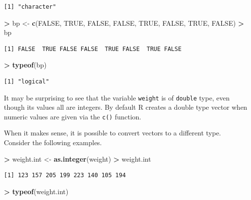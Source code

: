 \documentclass[]{krantz}
\makeatletter
\newenvironment{Shaded}{\begin{snugshade}}{\end{snugshade}}
\newcommand{\KeywordTok}[1]{\textcolor[rgb]{0.27,0.27,0.27}{\textbf{#1}}}
\newcommand{\StringTok}[1]{\textcolor[rgb]{0.5,0.5,0.5}{#1}}
\newcommand{\OtherTok}[1]{\textcolor[rgb]{0.37,0.37,0.37}{#1}}
\newcommand{\OperatorTok}[1]{\textcolor[rgb]{0.43,0.43,0.43}{\textbf{#1}}}
\newcommand{\NormalTok}[1]{#1}
\newenvironment{kframe}{%
\medskip{}
\setlength{\fboxsep}{.8em}
 \def\at@end@of@kframe{}%
 \ifinner\ifhmode%
  \def\at@end@of@kframe{\end{minipage}}%
  \begin{minipage}{\columnwidth}%
 \fi\fi%
 \def\FrameCommand##1{\hskip\@totalleftmargin \hskip-\fboxsep
 \colorbox{shadecolor}{##1}\hskip-\fboxsep
     \hskip-\linewidth \hskip-\@totalleftmargin \hskip\columnwidth}%
 \MakeFramed {\advance\hsize-\width
   \@totalleftmargin\z@ \linewidth\hsize
   \@setminipage}}%
 {\par\unskip\endMakeFramed%
 \at@end@of@kframe}
\renewenvironment{Shaded}{\begin{kframe}}{\end{kframe}}
\makeatother
\begin{document}
\begin{verbatim}
[1] "character"
\end{verbatim}

\begin{Shaded}
\begin{Highlighting}[]
\OperatorTok{>}\StringTok{ }\NormalTok{bp <-}\StringTok{ }\KeywordTok{c}\NormalTok{(}\OtherTok{FALSE}\NormalTok{, }\OtherTok{TRUE}\NormalTok{, }\OtherTok{FALSE}\NormalTok{, }\OtherTok{FALSE}\NormalTok{, }\OtherTok{TRUE}\NormalTok{, }\OtherTok{FALSE}\NormalTok{, }\OtherTok{TRUE}\NormalTok{, }\OtherTok{FALSE}\NormalTok{)}
\OperatorTok{>}\StringTok{ }\NormalTok{bp}
\end{Highlighting}
\end{Shaded}

\begin{verbatim}
[1] FALSE  TRUE FALSE FALSE  TRUE FALSE  TRUE FALSE
\end{verbatim}

\begin{Shaded}
\begin{Highlighting}[]
\OperatorTok{>}\StringTok{ }\KeywordTok{typeof}\NormalTok{(bp)}
\end{Highlighting}
\end{Shaded}

\begin{verbatim}
[1] "logical"
\end{verbatim}

It may be surprising to see that the variable \texttt{weight} is of
\texttt{double} type, even though its values all are integers. By
default R creates a double type vector when numeric values are given via
the \texttt{c()} function.

When it makes sense, it is possible to convert vectors to a different
type. Consider the following examples.

\begin{Shaded}
\begin{Highlighting}[]
\OperatorTok{>}\StringTok{ }\NormalTok{weight.int <-}\StringTok{ }\KeywordTok{as.integer}\NormalTok{(weight)}
\OperatorTok{>}\StringTok{ }\NormalTok{weight.int}
\end{Highlighting}
\end{Shaded}

\begin{verbatim}
[1] 123 157 205 199 223 140 105 194
\end{verbatim}

\begin{Shaded}
\begin{Highlighting}[]
\OperatorTok{>}\StringTok{ }\KeywordTok{typeof}\NormalTok{(weight.int)}
\end{Highlighting}
\end{Shaded}
\end{document}
